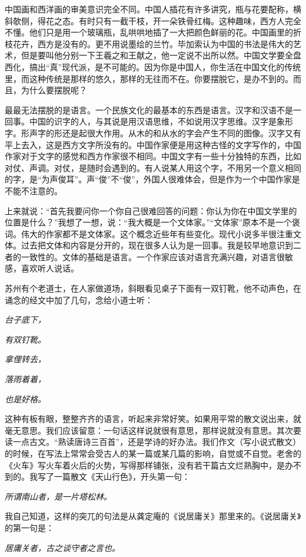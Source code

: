 \documentclass[fontset=fandol,12pt,a5paper]{ctexbook}
\begin{document}
中国画和西洋画的审美意识完全不同。中国人插花有许多讲究，瓶与花要配称，横斜欹侧，得花之态。有时只有一截干枝，开一朵铁骨红梅。这种趣味，西方人完全不懂。他们只是用一个玻璃瓶，乱哄哄地插了一大把颜色鲜丽的花。中国画里的折枝花卉，西方是没有的。更不用说墨绘的兰竹。毕加索认为中国的书法是伟大的艺术，但是要叫他分别一下王羲之和王献之，他一定说不出所以然。中国文学要全盘西化，搞出“真”现代派，是不可能的。因为你是中国人，你生活在中国文化的传统里，而这种传统是那样的悠久，那样的无往而不在。你要摆脱它，是办不到的。而且，为什么要摆脱呢？

最最无法摆脱的是语言。一个民族文化的最基本的东西是语言。汉字和汉语不是一回事。中国的识字的人，与其说是用汉语思维，不如说用汉字思维。汉字是象形字。形声字的形还是起很大作用。从木的和从水的字会产生不同的图像。汉字又有平上去入，这是西方文字所没有的。中国作家便是用这种古怪的文字写作的，中国作家对于文字的感觉和西方作家很不相同。中国文字有一些十分独特的东西，比如对仗、声调。对仗，是随时会遇到的。有人说某人用这个字，不用另一个意义相同的字，是“为声俊耳”。声“俊”不“俊”，外国人很难体会，但是作为一个中国作家是不能不注意的。

上来就说：“首先我要问你一个你自己很难回答的问题：你认为你在中国文学里的位置是什么？”我想了一想，说：“我大概是一个文体家。”“文体家”原本不是一个褒词。伟大的作家都不是文体家。这个概念近些年有些变化。现代小说多半很注重文体。过去把文体和内容是分开的，现在很多人认为是一回事。我是较早地意识到二者的一致性的。文体的基础是语言。一个作家应该对语言充满兴趣，对语言很敏感，喜欢听人说话。

苏州有个老道士，在人家做道场，斜眼看见桌子下面有一双钉靴，他不动声色，在诵念的经文中加了几句，念给小道士听：

\centerline{\emph{台子底下，}}
\centerline{\emph{有双钉靴。}}
\centerline{\emph{拿俚转去，}}
\centerline{\emph{落雨着着，}}
\centerline{\emph{也是好格。}}

这种有板有眼，整整齐齐的语言，听起来非常好笑。如果用平常的散文说出来，就毫无意思。我们应该留意：一句话这样说就很有意思，那样说就没有意思。其次要读一点古文。“熟读唐诗三百首”，还是学诗的好办法。我们作文（写小说式散文）的时候，在写法上常常会受古人的某一篇或某几篇的影响，自觉或不自觉。老舍的《火车》写火车着火后的火势，写得那样铺张，没有若干篇古文烂熟胸中，是办不到的。我写了一篇散文《天山行色》，开头第一句：

\centerline{\emph{所谓南山者，是一片塔松林。}}

我自己知道，这样的突兀的句法是从龚定庵的《说居庸关》那里来的。《说居庸关》的第一句是：

\centerline{\emph{居庸关者，古之谈守者之言也。}}
\end{document}

